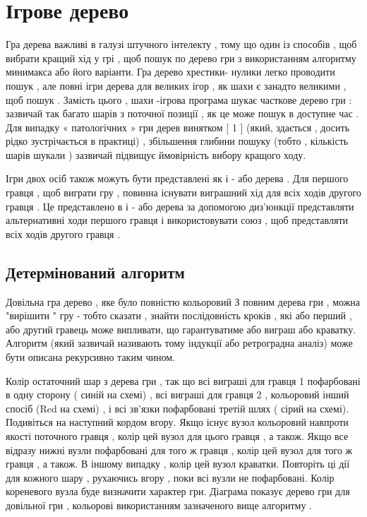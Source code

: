 \section{Ігрове дерево}
Гра дерева важливі в галузі штучного інтелекту , тому що один із способів , щоб вибрати кращий хід у грі , щоб пошук по дерево гри з використанням алгоритму минимакса або його варіанти. Гра дерево хрестики- нулики легко проводити пошук , але повні ігри дерева для великих ігор , як шахи є занадто великими , щоб пошук . Замість цього , шахи -ігрова програма шукає часткове дерево гри : зазвичай так багато шарів з поточної позиції , як це може пошук в доступне час . Для випадку « патологічних » гри дерев винятком [ 1 ] (який, здається , досить рідко зустрічається в практиці) , збільшення глибини пошуку (тобто , кількість шарів шукали ) зазвичай підвищує ймовірність вибору кращого ходу.

Ігри двох осіб також можуть бути представлені як і - або дерева . Для першого гравця , щоб виграти гру , повинна існувати виграшний хід для всіх ходів другого гравця . Це представлено в і - або дерева за допомогою диз'юнкції представляти альтернативні ходи першого гравця і використовувати союз , щоб представляти всіх ходів другого гравця .
\subsection{Детермінований алгоритм}
Довільна гра дерево , яке було повністю кольоровий З повним дерева гри , можна "вирішити " гру - тобто сказати , знайти послідовність кроків , які або перший , або другий гравець може випливати, що гарантуватиме або виграш або краватку. Алгоритм (який зазвичай називають тому індукції або ретроградна аналіз) може бути описана рекурсивно таким чином.

Колір остаточний шар з дерева гри , так що всі виграші для гравця 1 пофарбовані в одну сторону ( синій на схемі) , всі виграші для гравця 2 , кольоровий інший спосіб (Red на схемі) , і всі зв'язки пофарбовані третій шлях ( сірий на схемі). Подивіться на наступний кордом вгору. Якщо існує вузол кольоровий навпроти якості поточного гравця , колір цей вузол для цього гравця , а також. Якщо все відразу нижні вузли пофарбовані для того ж гравця , колір цей вузол для того ж гравця , а також. В іншому випадку , колір цей вузол краватки. Повторіть ці дії для кожного шару , рухаючись вгору , поки всі вузли не пофарбовані. Колір кореневого вузла буде визначити характер гри. Діаграма показує дерево гри для довільної гри , кольорові використанням зазначеного вище алгоритму .

